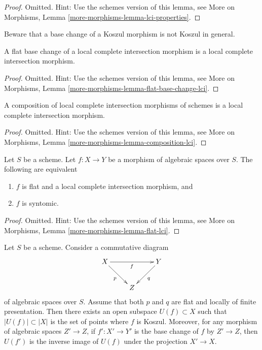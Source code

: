 \begin{proof}
Omitted. Hint: Use the schemes version of this lemma, see
More on Morphisms,
Lemma \ref{more-morphisms-lemma-lci-properties}.
\end{proof}

\noindent
Beware that a base change of a Koszul morphism is not Koszul in general.

\begin{lemma}
\label{lemma-flat-base-change-lci}
A flat base change of a local complete intersection morphism is a
local complete intersection morphism.
\end{lemma}

\begin{proof}
Omitted. Hint: Use the schemes version of this lemma, see
More on Morphisms,
Lemma \ref{more-morphisms-lemma-flat-base-change-lci}.
\end{proof}

\begin{lemma}
\label{lemma-composition-lci}
A composition of local complete intersection morphisms of schemes is a
local complete intersection morphism.
\end{lemma}

\begin{proof}
Omitted. Hint: Use the schemes version of this lemma, see
More on Morphisms,
Lemma \ref{more-morphisms-lemma-composition-lci}.
\end{proof}

\begin{lemma}
\label{lemma-flat-lci}
Let $S$ be a scheme.
Let $f : X \to Y$ be a morphism of algebraic spaces over $S$.
The following are equivalent
\begin{enumerate}
\item $f$ is flat and a local complete intersection morphism, and
\item $f$ is syntomic.
\end{enumerate}
\end{lemma}

\begin{proof}
Omitted. Hint: Use the schemes version of this lemma, see
More on Morphisms,
Lemma \ref{more-morphisms-lemma-flat-lci}.
\end{proof}

\begin{lemma}
\label{lemma-base-change-lci-fibres}
Let $S$ be a scheme. Consider a commutative diagram
$$
\xymatrix{
X \ar[rr]_f \ar[rd]_p & & Y \ar[ld]^q \\
& Z
}
$$
of algebraic spaces over $S$. Assume that both $p$ and $q$
are flat and locally of finite presentation.
Then there exists an open subspace $U(f) \subset X$
such that $|U(f)| \subset |X|$ is the set of points where $f$ is Koszul.
Moreover, for any morphism of algebraic spaces $Z' \to Z$, if
$f' : X' \to Y'$ is the base change of $f$ by $Z' \to Z$, then
$U(f')$ is the inverse image of $U(f)$ under the projection $X' \to X$.
\end{lemma}

